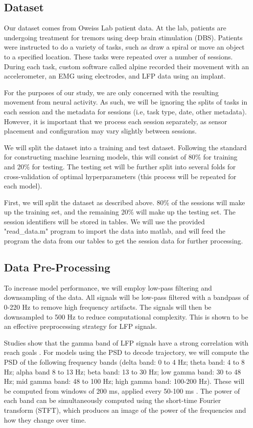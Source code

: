 \documentclass[12pt]{article}
\begin{document}
\subsection{Dataset}

Our dataset comes from Oweiss Lab patient data. At the lab, patients are undergoing treatment for tremors using deep brain stimulation (DBS). Patients were instructed to do a variety of tasks, such as draw a spiral or move an object to a specified location. These tasks were repeated over a number of sessions. During each task, custom software called alpine recorded their movement with an accelerometer, an EMG using electrodes, and LFP data using an implant. 

For the purposes of our study, we are only concerned with the resulting movement from neural activity. As such, we will be ignoring the splits of tasks in each session and the metadata for sessions (i.e, task type, date, other metadata). However, it is important that we process each session separately, as sensor placement and configuration may vary slightly between sessions.

We will split the dataset into a training and test dataset. Following the standard for constructing machine learning models, this will consist of 80\% for training and 20\% for testing. The testing set will be further split into several folds for cross-validation of optimal hyperparameters (this process will be repeated for each model).

First, we will split the dataset as described above. 80\% of the sessions will make up the training set, and the remaining 20\% will make up the testing set. The session identifiers will be stored in tables. We will use the provided "read\_data.m" program to import the data into matlab, and will feed the program the data from our tables to get the session data for further processing.

\subsection{Data Pre-Processing}

To increase model performance, we will employ low-pass filtering and downsampling of the data. All signals will be low-pass filtered with a bandpass of 0-220  Hz to remove high frequency artifacts. The signals will then be downsampled to 500 Hz to reduce computational complexity. This is shown to be an effective preprocessing strategy for LFP signals. \cite{ince2010}

Studies show that the gamma band of LFP signals have a strong correlation with reach goals \cite{hwang2012}. For models using the PSD to decode trajectory, we will compute the PSD of the following frequency bands (delta band: 0 to 4 Hz; theta band: 4 to 8 Hz; alpha band 8 to 13 Hz; beta band: 13 to 30 Hz; low gamma band: 30 to 48 Hz; mid gamma band: 48 to 100 Hz; high gamma band: 100-200 Hz). These will be computed from windows of 200 ms, applied every 50-100 ms \cite{zhang2013}. The power of each band can be simultaneously computed using the short-time Fourier transform (STFT), which produces an image of the power of the frequencies and how they change over time.
\end{document}

